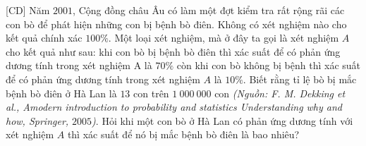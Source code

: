 \begin{bt}%
[CD]%
	Năm $2001$, Cộng đồng châu Âu có làm một đợt kiểm tra rất rộng rãi các con bò để phát hiện những con bị bệnh bò điên. Không có xét nghiệm nào cho kết quả chính xác $100 \%$. Một loại xét nghiệm, mà ở đây ta gọi là xét nghiệm $A$ cho kết quả như sau: khi con bò bị bệnh bò điên thì xác suất để có phản ứng dương tính trong xét nghiệm A là $70 \%$ còn khi con bò không bị bệnh thì xác suất để có phản ứng dương tính trong xét nghiệm $A$ là $10 \%$. Biết rằng tỉ lệ bò bị mắc bệnh bò điên ở Hà Lan là $13$ con trên $1~000~000$ con \textit{(Nguồn: F. M. Dekking et al., Amodern introduction to probability and statistics Understanding why and how, Springer, $2005$)}. Hỏi khi một con bò ở Hà Lan có phản ứng dương tính với xét nghiệm $A$ thì xác suất để nó bị mắc bệnh bò điên là bao nhiêu?
\end{bt}

